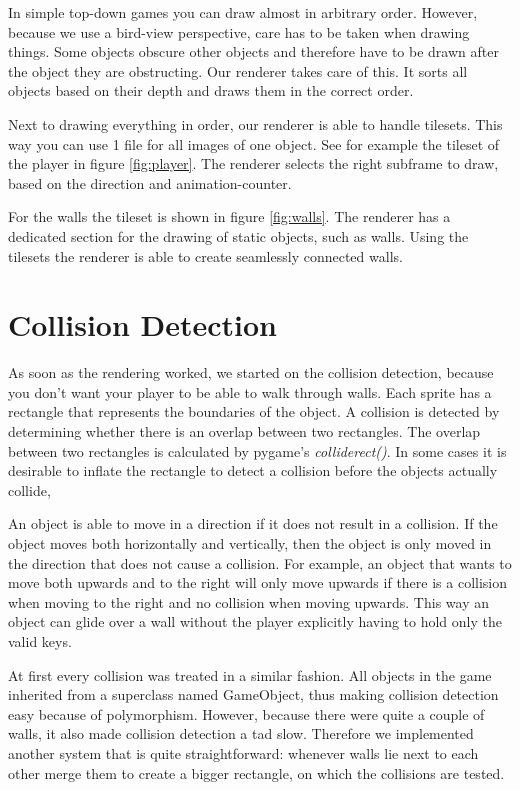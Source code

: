 \documentclass[a4paper,pdf,12pt]{article}
\begin{document}
In simple top-down games you can draw almost in arbitrary order. However, because we use a bird-view perspective, care has to be taken when drawing things. Some objects obscure other objects and therefore have to be drawn after the object they are obstructing. Our renderer takes care of this. It sorts all objects based on their depth and draws them in the correct order.

Next to drawing everything in order, our renderer is able to handle tilesets. This way you can use 1 file for all images of one object. See for example the tileset of the player in figure \ref{fig:player}. The renderer selects the right subframe to draw, based on the direction and animation-counter.

For the walls the tileset is shown in figure \ref{fig:walls}. The renderer has a dedicated section for the drawing of static objects, such as walls. Using the tilesets the renderer is able to create seamlessly connected walls.



\section{Collision Detection}
\label{sec:Collision Detection}
As soon as the rendering worked, we started on the collision detection, because you don't want your player to be able to walk through walls. Each sprite has a rectangle that represents the boundaries of the object. A collision is detected by determining whether there is an overlap between two rectangles. The overlap between two rectangles is calculated by pygame's \textit{colliderect()}. In some cases it is desirable to inflate the rectangle to detect a collision before the objects actually collide,

An object is able to move in a direction if it does not result in a collision. If the object moves both horizontally and vertically, then the object is only moved in the direction that does not cause a collision. For example, an object that wants to move both upwards and to the right will only move upwards if there is a collision when moving to the right and no collision when moving upwards. This way an object can glide over a wall without the player explicitly having to hold only the valid keys. 

At first every collision was treated in a similar fashion. All objects in the game inherited from a superclass named GameObject, thus making collision detection easy because of polymorphism. However, because there were quite a couple of walls, it also made collision detection a tad slow. Therefore we implemented another system that is quite straightforward: whenever walls lie next to each other merge them to create a bigger rectangle, on which the collisions are tested.
\end{document}
